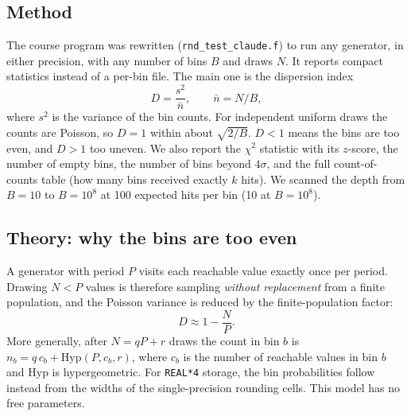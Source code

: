 \documentclass[11pt]{article}
\begin{document}
\subsection{Method}
The course program was rewritten (\texttt{rnd\_test\_claude.f}) to run any generator, in either precision, with any number of bins $B$ and draws $N$. It reports compact statistics instead of a per-bin file. The main one is the dispersion index
\begin{equation}
D = \frac{s^2}{\bar n}, \qquad \bar n = N/B,
\end{equation}
where $s^2$ is the variance of the bin counts. For independent uniform draws the counts are Poisson, so $D = 1$ within about $\sqrt{2/B}$. $D < 1$ means the bins are too even, and $D > 1$ too uneven. We also report the $\chi^2$ statistic with its $z$-score, the number of empty bins, the number of bins beyond $4\sigma$, and the full count-of-counts table (how many bins received exactly $k$ hits). We scanned the depth from $B = 10$ to $B = 10^8$ at 100 expected hits per bin (10 at $B=10^8$).

\subsection{Theory: why the bins are too even}
A generator with period $P$ visits each reachable value exactly once per period. Drawing $N<P$ values is therefore sampling \emph{without replacement} from a finite population, and the Poisson variance is reduced by the finite-population factor:
\begin{equation}
D \approx 1 - \frac{N}{P}.
\end{equation}
More generally, after $N = qP + r$ draws the count in bin $b$ is $n_b = q\,c_b + \mathrm{Hyp}(P, c_b, r)$, where $c_b$ is the number of reachable values in bin $b$ and $\mathrm{Hyp}$ is hypergeometric. For \texttt{REAL*4} storage, the bin probabilities follow instead from the widths of the single-precision rounding cells. This model has no free parameters.
\end{document}
